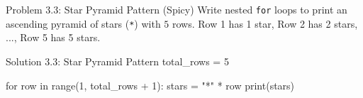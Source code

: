 \begin{snakelab}{Problem 3.3: Star Pyramid Pattern (Spicy)}
Write nested \texttt{for} loops to print an ascending pyramid of stars (\texttt{*}) with $5$ rows.
Row 1 has 1 star, Row 2 has 2 stars, ..., Row 5 has 5 stars.
\end{snakelab}

\begin{pycode}{Solution 3.3: Star Pyramid Pattern}
total_rows = 5

for row in range(1, total_rows + 1):
    stars = "*" * row
    print(stars)
\end{pycode}
